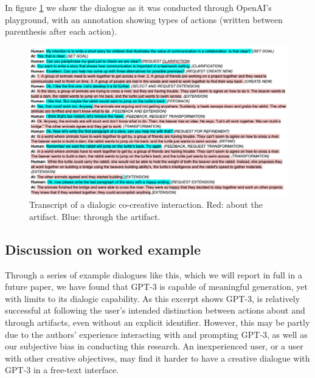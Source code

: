 \documentclass[manuscript,review]{acmart}
\begin{document}
In figure \ref{fig:transcript} we show the dialogue as it was conducted through OpenAI's playground, with an annotation showing types of actions (written between parenthesis after each action).

\begin{figure}
  \includegraphics[width=\linewidth]{./TRANSCRIPT.png}
  \caption{Transcript of a dialogic co-creative interaction. Red: about the artifact. Blue: through the artifact.}
  \label{fig:transcript}
\end{figure}

\subsection{Discussion on worked example}

Through a series of example dialogues like this, which we will report in full in a future paper, we have found that GPT-3 is capable of meaningful generation, yet with limits to its dialogic capability. As this excerpt shows GPT-3, is relatively successful at following the user's intended distinction between actions about and through artifacts, even without an explicit identifier. However, this may be partly due to the authors' experience interacting with and prompting GPT-3, as well as our subjective bias in conducting this research. An inexperienced user, or a user with other creative objectives, may find it harder to have a creative dialogue with GPT-3 in a free-text interface. 
\end{document}
